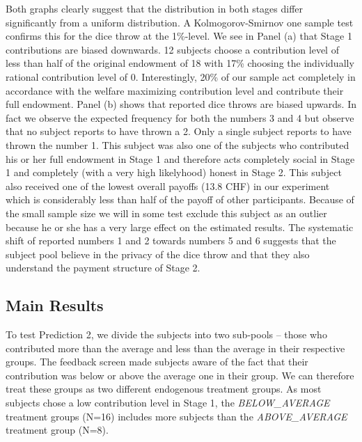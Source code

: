 \documentclass[12pt, a4paper]{article}
\begin{document}
Both graphs clearly suggest that the distribution in both stages differ significantly from a uniform distribution. A Kolmogorov-Smirnov one sample test confirms this for the dice throw at the 1\%-level. We see in Panel (a) that Stage 1 contributions are biased downwards. 12 subjects choose a contribution level of less than half of the original endowment of 18 with 17\% choosing the individually rational contribution level of 0. Interestingly, 20\% of our sample act completely in accordance with the welfare maximizing contribution level and contribute their full endowment. Panel (b) shows that reported dice throws are biased upwards. In fact we observe the expected frequency for both the numbers 3 and 4 but observe that no subject reports to have thrown a 2. Only a single subject reports to have thrown the number 1. This subject was also one of the subjects who contributed his or her full endowment in Stage 1 and therefore acts completely social in Stage 1 and completely (with a very high likelyhood) honest in Stage 2. This subject also received one of the lowest overall payoffs (13.8 CHF) in our experiment which is considerably less than half of the payoff of other participants. Because of the small sample size we will in some test exclude this subject as an outlier because he or she has a very large effect on the estimated results. The systematic shift of reported numbers 1 and 2 towards numbers 5 and 6 suggests that the subject pool believe in the privacy of the dice throw and that they also understand the payment structure of Stage 2.


\subsection{Main Results}

To test Prediction 2, we divide the subjects into two sub-pools -- those who contributed more than the average and less than the average in their respective groups. The feedback screen made subjects aware of the fact that their contribution was below or above the average one in their group. We can therefore treat these groups as two different endogenous treatment groups. As most subjects chose a low contribution level in Stage 1, the \emph{BELOW\_AVERAGE} treatment groups (N=16) includes more subjects than the \emph{ABOVE\_AVERAGE} treatment group (N=8).
\end{document}
